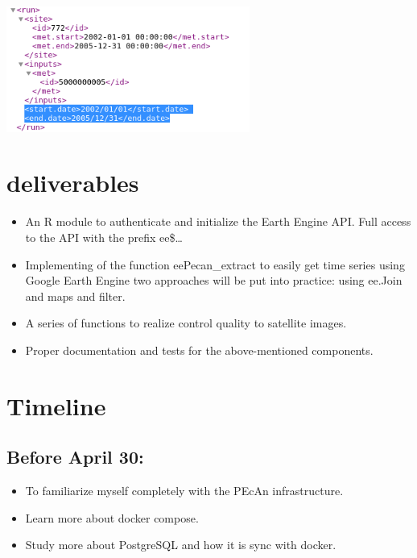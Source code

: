 \documentclass{eepecan}
\begin{document}
\begin{enumerate}
		\begin{novspacecenter}
			\includegraphics[width=80mm]{figures/fig04_xml}
			\label{fig:fig01main}
		\end{novspacecenter}
	\end{enumerate}
	\section{deliverables}
	\begin{itemize}
		\item An R module to authenticate and initialize the Earth Engine API. Full access to the API with the prefix ee\$…
		\item Implementing of the function eePecan\_extract to easily get time series using Google Earth Engine two approaches will be put into practice: using ee.Join and maps and filter.
		\item A series of functions to realize control quality to satellite images.
		\item Proper documentation and tests for the above-mentioned components.	
	\end{itemize}
	\section{Timeline}
	
	\subsection*{Before April 30:}
	
	\begin{itemize}
		\item To familiarize myself completely with the PEcAn infrastructure.
		\item Learn more about docker compose.
		\item Study more about PostgreSQL and how it is sync with docker.
	\end{itemize}
	
\end{document}
